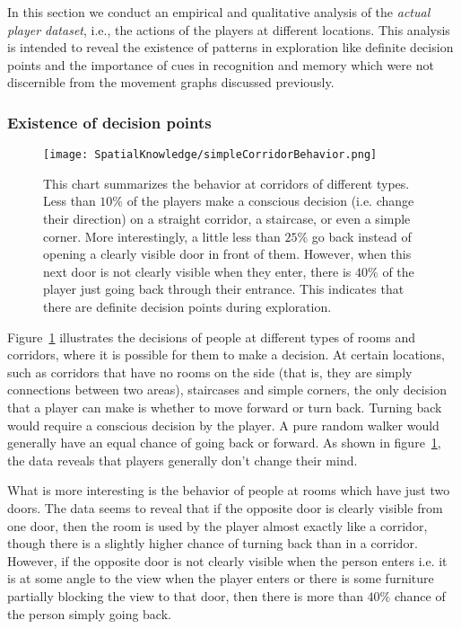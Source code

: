 In this section we conduct an empirical and qualitative analysis of the \emph{actual player dataset}, i.e., the actions of the players at different locations. This analysis is intended to reveal the existence of patterns in exploration like definite decision points and the importance of cues in recognition and memory which were not discernible from the movement graphs discussed previously.



\subsubsection{Existence of decision points} %
\label{sec:definite_decision_points}
\begin{figure}[!tb]
    \begin{center}
        \texttt{[image: SpatialKnowledge/simpleCorridorBehavior.png]}
    \end{center}
    \caption[Existence of definite decision points]{This chart summarizes the behavior at corridors of different types. Less than $10\%$ of the players make a conscious decision (i.e. change their direction) on a straight corridor, a staircase, or even a simple corner. More interestingly, a little less than $25\%$ go back instead of opening a clearly visible door in front of them. However, when this next door is not clearly visible when they enter, there is $40\%$ of the player just going back through their entrance. This indicates that there are definite decision points during exploration.}
    \label{fig:simpleCorridorBehavior}
\end{figure}

Figure~\ref{fig:simpleCorridorBehavior} illustrates the decisions of people at different types of rooms and corridors, where it is possible for them to make a decision. At certain locations, such as corridors that have no rooms on the side (that is, they are simply connections between two areas), staircases and simple corners, the only decision that a player can make is whether to move forward or turn back. Turning back would require a conscious decision by the player. A pure random walker would generally have an equal chance of going back or forward. As shown in figure~\ref{fig:simpleCorridorBehavior}, the data reveals that players generally don't change their mind.

What is more interesting is the behavior of people at rooms which have just two doors. The data seems to reveal that if the opposite door is clearly visible from one door, then the room is used by the player almost exactly like a corridor, though there is a slightly higher chance of turning back than in a corridor. However, if the opposite door is not clearly visible when the person enters i.e. it is at some angle to the view when the player enters or there is some furniture partially blocking the view to that door, then there is more than $40\%$ chance of the person simply going back.


